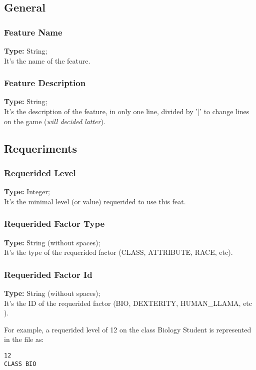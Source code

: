 \documentclass[letterpaper,12pt]{article}
\begin{document}
\subsection{General}

\subsubsection{Feature Name}
{\bf Type:} String;\\
It's the name of the feature.

\subsubsection{Feature Description}
{\bf Type:} String;\\
It's the description of the feature, in only one line, divided by '|' to change lines on the game ({\it will decided latter}).

\subsection{Requeriments}

\subsubsection{Requerided Level}
{\bf Type:} Integer;\\
It's the minimal level (or value) requerided to use this feat.

\subsubsection{Requerided Factor Type}
{\bf Type:} String (without spaces);\\
It's the type of the requerided factor (CLASS, ATTRIBUTE, RACE, etc).

\subsubsection{Requerided Factor Id}
{\bf Type:} String (without spaces);\\
It's the ID of the requerided factor (BIO, DEXTERITY, HUMAN\_LLAMA, etc ).

For example, a requerided level of 12 on the class Biology Student is represented in the file as:

\begin{verbatim}
12
CLASS BIO
\end{verbatim}
\end{document}
